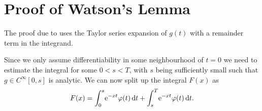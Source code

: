 \section{Proof of Watson's Lemma}
\label{sec:proof-watson}
\begin{Theorem}
  
  \begin{Proof}
    The proof due to \cite{Miller2006} uses the Taylor series expansion of
    $g(t)$ with a remainder term in the integrand.

    Since we only assume differentiability in some neighbourhood of $t=0$ we
    need to estimate the integral for some $0 < s < T$, with $s$ being
    sufficiently small such that $g\in C^{\infty}[0,s]$ is analytic. We
    can now split up the integral $F(x)$ as
    \begin{equation*}
      F(x) = \Integ[s]{0}{t}{\Eto{-xt}\phi(t)} +
      \Integ[T]{s}{t}{\Eto{-xt}\phi(t)}.
    \end{equation*}


\end{Proof}
\end{Theorem}
